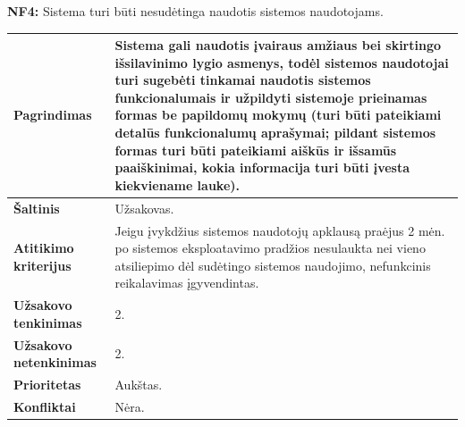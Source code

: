 \documentclass[12pt]{article}
\begin{document}
\noindent \textbf{NF4:} Sistema turi būti nesudėtinga naudotis sistemos
naudotojams.
\label{sec:NF4}
\begin{table}[htb!]
    \captionsetup{justification=centering}
    \vskip -10pt
    \begin{tabular}{|m{4.9cm}|m{11cm}|}
        \hline
        \raggedleft \textbf{\cellcolor{deepchampagne}Pagrindimas} &
        Sistema gali naudotis įvairaus amžiaus bei skirtingo išsilavinimo lygio
        asmenys, todėl sistemos naudotojai turi sugebėti tinkamai naudotis
        sistemos funkcionalumais ir užpildyti sistemoje prieinamas formas be
        papildomų mokymų (turi būti pateikiami detalūs funkcionalumų aprašymai;
        pildant sistemos formas turi būti pateikiami aiškūs ir išsamūs
        paaiškinimai, kokia informacija turi būti įvesta kiekviename lauke). \\
        \hline
        \raggedleft \textbf{\cellcolor{deepchampagne}Šaltinis} & Užsakovas. \\
        \hline
        \raggedleft \textbf{\cellcolor{deepchampagne}Atitikimo kriterijus} & 
        Jeigu įvykdžius sistemos naudotojų apklausą praėjus 2 mėn. po sistemos
        eksploatavimo pradžios nesulaukta nei vieno atsiliepimo dėl sudėtingo
        sistemos naudojimo, nefunkcinis reikalavimas įgyvendintas. \\
        \hline
        \raggedleft \textbf{\cellcolor{deepchampagne}Užsakovo tenkinimas} & 2. \\
        \hline
        \raggedleft \textbf{\cellcolor{deepchampagne}Užsakovo netenkinimas} & 2. \\
        \hline
        \raggedleft \textbf{\cellcolor{deepchampagne}Prioritetas} & Aukštas. \\
        \hline
        \raggedleft \textbf{\cellcolor{deepchampagne}Konfliktai} & Nėra. \\
        \hline
    \end{tabular}
\end{table}
\end{document}
